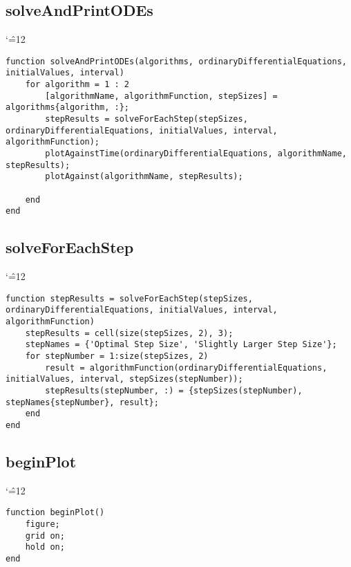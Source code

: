 \documentclass[12pt]{report}
\newenvironment{simplechar}{%
   \catcode`\^=12
}{}
\begin{document}
\subsection{solveAndPrintODEs}
\begin{simplechar}
\begin{lstlisting}
function solveAndPrintODEs(algorithms, ordinaryDifferentialEquations, initialValues, interval)
    for algorithm = 1 : 2
        [algorithmName, algorithmFunction, stepSizes] = algorithms{algorithm, :};
        stepResults = solveForEachStep(stepSizes, ordinaryDifferentialEquations, initialValues, interval, algorithmFunction);
        plotAgainstTime(ordinaryDifferentialEquations, algorithmName, stepResults);
        plotAgainst(algorithmName, stepResults);

    end
end
\end{lstlisting}
\end{simplechar}

\subsection{solveForEachStep}
\begin{simplechar}
\begin{lstlisting}
function stepResults = solveForEachStep(stepSizes, ordinaryDifferentialEquations, initialValues, interval, algorithmFunction)
    stepResults = cell(size(stepSizes, 2), 3);
    stepNames = {'Optimal Step Size', 'Slightly Larger Step Size'};
    for stepNumber = 1:size(stepSizes, 2)
        result = algorithmFunction(ordinaryDifferentialEquations, initialValues, interval, stepSizes(stepNumber));
        stepResults(stepNumber, :) = {stepSizes(stepNumber), stepNames{stepNumber}, result};
    end
end
\end{lstlisting}
\end{simplechar}

\subsection{beginPlot}
\begin{simplechar}
\begin{lstlisting}
function beginPlot()
    figure;
    grid on;
    hold on;
end
\end{lstlisting}
\end{simplechar}
\end{document}
